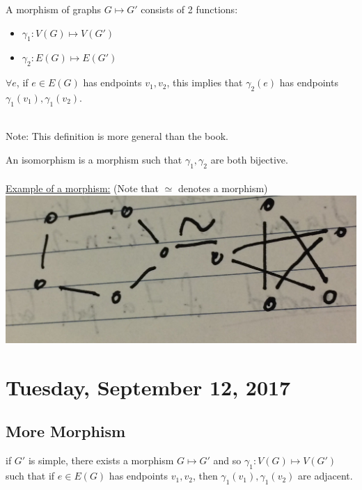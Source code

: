 \documentclass[12pt]{article}
\begin{document}
A morphism of graphs $G \mapsto G'$ consists of 2 functions:
\begin{itemize}
	\item{$\gamma_1 : V(G) \mapsto V(G')$}
	\item{$\gamma_2 : E(G) \mapsto E(G')$}
\end{itemize}

$\forall e$, if $e \in E(G)$ has endpoints $v_1, v_2$, this implies that $\gamma_2 (e)$ has endpoints $\gamma_1 (v_1), \gamma_1 (v_2)$.\\
\\
\begin{tcolorbox}
	Note: This definition is more general than the book.
\end{tcolorbox}

An isomorphism is a morphism such that $\gamma_1, \gamma_2$ are both bijective.
\\
\\
\underline{Example of a morphism:} (Note that $\simeq$ denotes a morphism)\\
\includegraphics[scale=0.125]{lec2-4}

\newpage

\section{Tuesday, September 12, 2017}

\subsection{More Morphism}

\begin{tcolorbox}[title=Observation 1]
	if $G'$ is simple, there exists a morphism $G \mapsto G'$ and so $\gamma_1 : V(G) \mapsto V(G')$ such that if $e\in E(G)$ has endpoints $v_1, v_2$, then $\gamma_1 (v_1), \gamma_1 (v_2)$ are adjacent.
\end{tcolorbox}
\end{document}
